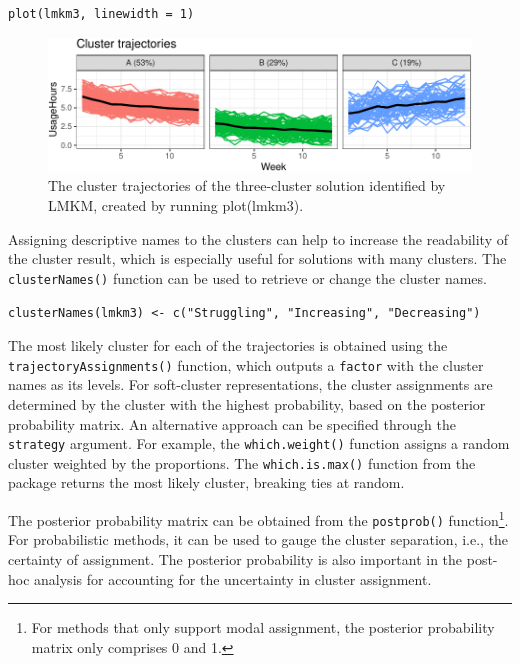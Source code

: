 \begin{verbatim}
plot(lmkm3, linewidth = 1)
\end{verbatim}

\begin{figure}

{\centering \includegraphics{figures/trends-1} 

}

\caption{The cluster trajectories of the three-cluster solution identified by LMKM, created by running plot(lmkm3).}\label{fig:trends}
\end{figure}

Assigning descriptive names to the clusters can help to increase the readability of the cluster result, which is especially useful for solutions with many clusters. The \texttt{clusterNames()} function can be used to retrieve or change the cluster names.

\begin{verbatim}
clusterNames(lmkm3) <- c("Struggling", "Increasing", "Decreasing")
\end{verbatim}

The most likely cluster for each of the trajectories is obtained using the \texttt{trajectoryAssignments()} function, which outputs a \texttt{factor} with the cluster names as its levels. For soft-cluster representations, the cluster assignments are determined by the cluster with the highest probability, based on the posterior probability matrix. An alternative approach can be specified through the \texttt{strategy} argument. For example, the \texttt{which.weight()} function assigns a random cluster weighted by the proportions. The \texttt{which.is.max()} function from the  package \citep{venables2002modern} returns the most likely cluster, breaking ties at random.

The posterior probability matrix can be obtained from the \texttt{postprob()} function\footnote{For methods that only support modal assignment, the posterior probability matrix only comprises 0 and 1.}. For probabilistic methods, it can be used to gauge the cluster separation, i.e., the certainty of assignment. The posterior probability is also important in the post-hoc analysis for accounting for the uncertainty in cluster assignment.

